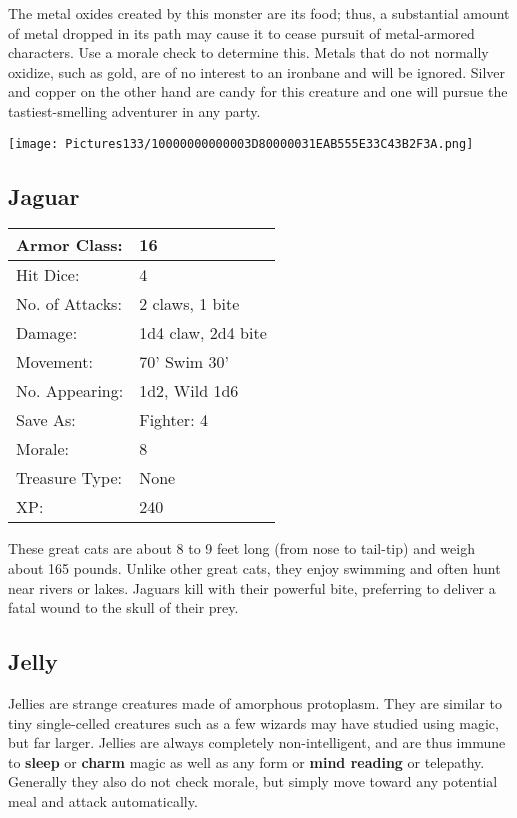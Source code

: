 \documentclass[a4paper,twoside,openany,10pt]{book}
\begin{document}
\begin{multicols}{2}
The metal oxides created by this monster are its food; thus, a substantial amount of metal dropped in its path may cause it to cease pursuit of metal-armored characters. Use a morale check to determine this.  Metals that do not normally oxidize, such as gold, are of no interest to an ironbane and will be ignored. Silver and copper on the other hand are candy for this creature and one will pursue the tastiest-smelling adventurer in any party.


\begin{center}
	\texttt{[image: Pictures133/10000000000003D80000031EAB555E33C43B2F3A.png]}
\end{center}


\subsection*{Jaguar}\label{jaguar}

\begin{tabularx}{0.50\textwidth}{@{}lX@{}}
Armor Class: & 16 \\\hline
Hit Dice: & 4 \\\hline
No. of Attacks: & 2 claws, 1 bite \\\hline
Damage: & 1d4 claw, 2d4 bite \\\hline
Movement: & 70' Swim 30' \\\hline
No. Appearing: & 1d2, Wild 1d6 \\\hline
Save As: & Fighter: 4 \\\hline
Morale: & 8 \\\hline
Treasure Type: & None \\\hline
XP: & 240 \\\hline
\end{tabularx}\medskip

These great cats are about 8 to 9 feet long (from nose to tail-tip) and weigh about 165 pounds. Unlike other great cats, they enjoy swimming and often hunt near rivers or lakes. Jaguars kill with their powerful bite, preferring to deliver a fatal wound to the skull of their prey. 

\subsection*{Jelly}\label{jelly}

Jellies are strange creatures made of amorphous protoplasm. They are similar to tiny single-celled creatures such as a few wizards may have studied using magic, but far larger. Jellies are always completely non-intelligent, and are thus immune to \textbf{sleep }or \textbf{charm }magic as well as any form or \textbf{mind reading }or telepathy. Generally they also do not check morale, but simply move toward any potential meal and attack automatically.


\end{multicols}
\end{document}
